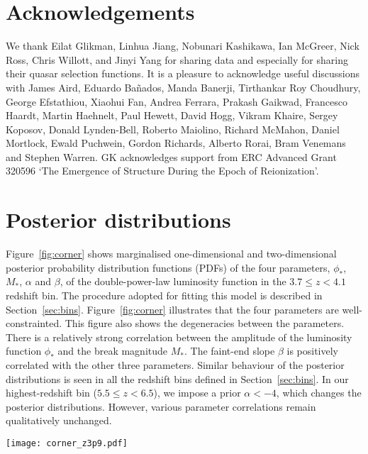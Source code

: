\documentclass[fleqn,usenatbib]{mnras}
\begin{document}
\section*{Acknowledgements}

We thank Eilat Glikman, Linhua Jiang, Nobunari Kashi\-kawa, Ian
McGreer, Nick Ross, Chris Willott, and Jinyi Yang for sharing data and
especially for sharing their quasar selection functions.  It is a
pleasure to acknowledge useful discussions with James Aird, Eduardo
Ba\~nados, Manda Banerji, Tirthankar Roy Choudhury, George Efstathiou,
Xiaohui Fan, Andrea Ferrara, Prakash Gaikwad, Francesco Haardt, Martin
Haehnelt, Paul Hewett, David Hogg, Vikram Khaire, Sergey Koposov,
Donald Lynden-Bell, Roberto Maiolino, Richard McMahon, Daniel
Mortlock, Ewald Puchwein, Gordon Richards, Alberto Rorai, Bram
Venemans and Stephen Warren.  GK acknowledges support from ERC
Advanced Grant 320596 `The Emergence of Structure During the Epoch of
Reionization'.

\appendix

\section{Posterior distributions}

Figure~\ref{fig:corner} shows marginalised one-dimensional and
two-dimensional posterior probability distribution functions (PDFs) of
the four parameters, $\phi_*$, $M_*$, $\alpha$ and $\beta$, of the
double-power-law luminosity function in the $3.7\leq z < 4.1$ redshift
bin.  The procedure adopted for fitting this model is described in
Section~\ref{sec:bins}.  Figure~\ref{fig:corner} illustrates that the
four parameters are well-constrainted.  This figure also shows the
degeneracies between the parameters.  There is a relatively strong
correlation between the amplitude of the luminosity function $\phi_*$
and the break magnitude $M_*$.  The faint-end slope $\beta$ is
positively correlated with the other three parameters.  Similar
behaviour of the posterior distributions is seen in all the redshift
bins defined in Section~\ref{sec:bins}.  In our highest-redshift bin
($5.5\leq z < 6.5$), we impose a prior $\alpha < -4$, which changes
the posterior distributions.  However, various parameter correlations
remain qualitatively unchanged.

\begin{figure*}
  \begin{center}
    \texttt{[image: corner\_z3p9.pdf]}
  \end{center}
  \caption{Posterior distributions of the four double-power-law
    parameters in the $3.7\leq z < 4.1$ redshift bin.  The blue
    squares indicate median values.  Similar behaviour of the
    posterior distributions is seen in all other redshift bins defined
    in Section~\ref{sec:bins}.
    \label{fig:corner}}
\end{figure*}
\end{document}
